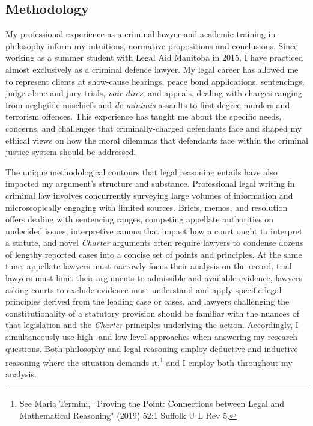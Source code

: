 \subsection{Methodology}

My professional experience as a criminal lawyer and academic training in philosophy inform my intuitions, normative propositions and conclusions. Since working as a summer student with Legal Aid Manitoba in 2015, I have practiced almost exclusively as a criminal defence lawyer. My legal career has allowed me to represent clients at show-cause hearings, peace bond applications, sentencings, judge-alone and jury trials, \textit{voir dires}, and appeals, dealing with charges ranging from negligible mischiefs and \textit{de minimis} assaults to first-degree murders and terrorism offences. This experience has taught me about the specific needs, concerns, and challenges that criminally-charged defendants face and shaped my ethical views on how the moral dilemmas that defendants face within the criminal justice system should be addressed. 

The unique methodological contours that legal reasoning entails have also impacted my argument's structure and substance. Professional legal writing in criminal law involves concurrently surveying large volumes of information and microscopically engaging with limited sources. Briefs, memos, and resolution offers dealing with sentencing ranges, competing appellate authorities on undecided issues, interpretive canons that impact how a court ought to interpret a statute, and novel \textit{Charter} arguments often require lawyers to condense dozens of lengthy reported cases into a concise set of points and principles. At the same time, appellate lawyers must narrowly focus their analysis on the record, trial lawyers must limit their arguments to admissible and available evidence, lawyers asking courts to exclude evidence must understand and apply specific legal principles derived from the leading case or cases, and lawyers challenging the constitutionality of a statutory provision should be familiar with the nuances of that legislation and the \textit{Charter} principles underlying the action. Accordingly, I simultaneously use high- and low-level approaches when answering my research questions. Both philosophy and legal reasoning employ deductive and inductive reasoning where the situation demands it,\footnote{See Maria Termini, ``Proving the Point: Connections between Legal and Mathematical Reasoning" (2019) 52:1 Suffolk U L Rev 5.} and I employ both throughout my analysis.

